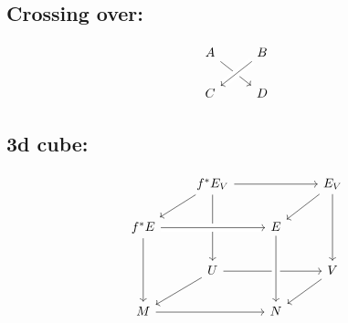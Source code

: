 \documentclass{article}
\begin{document}
\subsection*{Crossing over:}
$$
\begin{tikzcd}
A \arrow[rd] & B \arrow[ld,crossing over] \\
C & D
\end{tikzcd}
$$

\subsection*{3d cube:}

$$
\begin{tikzcd}
& f^* E_V \arrow[dl] \arrow[rr] \arrow[dd] & & E_V \arrow[dl] \arrow[dd] \\
f^* E \arrow[rr, crossing over] \arrow[dd] & & E \\
& U \arrow[dl] \arrow[rr] & & V \arrow[dl] \\
M \arrow[rr] & & N \arrow[from=uu, crossing over]\\
\end{tikzcd}
$$
\end{document}
